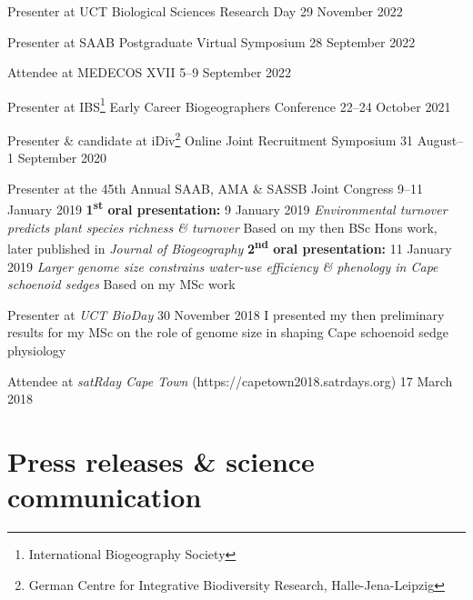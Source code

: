 \documentclass[10pt]{article}
\begin{document}
\begin{hangparas}{2em}{1}

Presenter at UCT Biological Sciences Research Day        \hfill 29 November 2022

Presenter at SAAB Postgraduate Virtual Symposium        \hfill 28 September 2022

Attendee at MEDECOS XVII                              \hfill 5--9 September 2022

Presenter at IBS\footnote{International Biogeography Society}
Early Career Biogeographers Conference                \hfill 22--24 October 2021

Presenter \& candidate at iDiv\footnote{German Centre for Integrative
Biodiversity Research, Halle-Jena-Leipzig} Online Joint Recruitment Symposium
                                              \hfill 31 August--1 September 2020

Presenter at the 45th Annual SAAB, AMA \& SASSB Joint Congress
                                               \hfill 9--11 January 2019 \break
\textbf{1\textsuperscript{st} oral presentation:}
                                                   \hfill 9 January 2019 \break
\textit{Environmental turnover predicts plant species richness \& turnover}
                                                                         \break
Based on my then BSc Hons work, later published in \textit{Journal of Biogeography} \break
\textbf{2\textsuperscript{nd} oral presentation:}
                                                  \hfill 11 January 2019 \break
\textit{Larger genome size constrains water-use efficiency \& phenology in 
Cape schoenoid sedges}                                                   \break
Based on my MSc work

Presenter at \textit{UCT BioDay}                 \hfill 30 November 2018 \break
I presented my then preliminary results for my MSc on the role of genome size in 
shaping Cape schoenoid sedge physiology

Attendee at \textit{satRday Cape Town} (https://capetown2018.satrdays.org)
                                                           \hfill 17 March 2018

\hfill

\end{hangparas}

\section*{Press releases \& science communication} %
\end{document}
